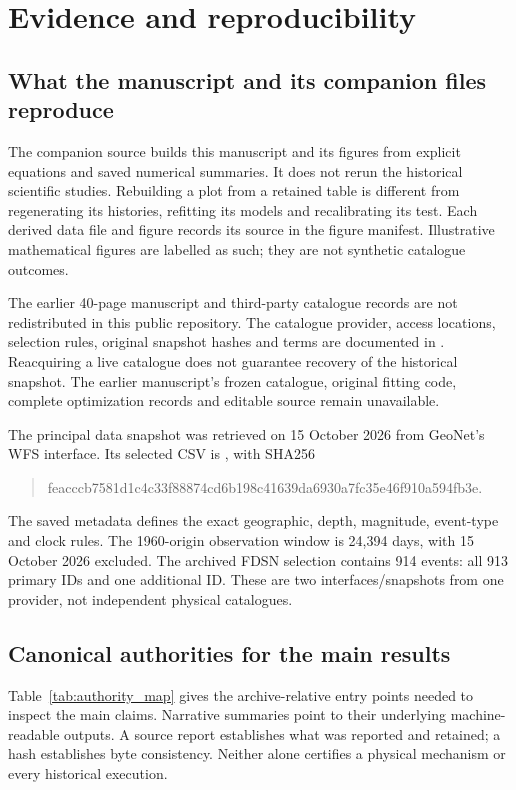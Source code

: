 \chapter{Evidence and reproducibility}
\label{app:evidence}

\section{What the manuscript and its companion files reproduce}

The companion source builds this manuscript and its figures from explicit equations and saved numerical summaries. It does not rerun the historical scientific studies. Rebuilding a plot from a retained table is different from regenerating its histories, refitting its models and recalibrating its test. Each derived data file and figure records its source in the figure manifest. Illustrative mathematical figures are labelled as such; they are not synthetic catalogue outcomes.

The earlier 40-page manuscript and third-party catalogue records are not redistributed in this public repository. The catalogue provider, access locations, selection rules, original snapshot hashes and terms are documented in . Reacquiring a live catalogue does not guarantee recovery of the historical snapshot. The earlier manuscript's frozen catalogue, original fitting code, complete optimization records and editable source remain unavailable.

The principal data snapshot was retrieved on 15 October 2026 from GeoNet's WFS interface. Its selected CSV is , with SHA256
\begin{quote}\small\ttfamily
feacccb7581d1c4c33f88874cd6b198c41639da6930a7fc35e46f910a594fb3e.
\end{quote}
The saved metadata defines the exact geographic, depth, magnitude, event-type and clock rules. The 1960-origin observation window is 24,394 days, with 15 October 2026 excluded. The archived FDSN selection contains 914 events: all 913 primary IDs and one additional ID. These are two interfaces/snapshots from one provider, not independent physical catalogues.

\section{Canonical authorities for the main results}

Table~\ref{tab:authority_map} gives the archive-relative entry points needed to inspect the main claims. Narrative summaries point to their underlying machine-readable outputs. A source report establishes what was reported and retained; a hash establishes byte consistency. Neither alone certifies a physical mechanism or every historical execution.

